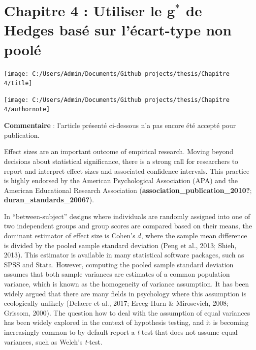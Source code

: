 \documentclass[
  english,
  man]{apa6}
\author{\phantom{0}}
\date{}
\affiliation{\phantom{0}}
\begin{document}
\hypertarget{chapitre-4-utiliser-le-bmg-de-hedges-basuxe9-sur-luxe9cart-type-non-pooluxe9}{%
\section{\texorpdfstring{Chapitre 4 : Utiliser le \(\bm{g^*}\) de Hedges basé sur l'écart-type non poolé}{Chapitre 4 : Utiliser le \textbackslash bm\{g\^{}*\} de Hedges basé sur l'écart-type non poolé}}\label{chapitre-4-utiliser-le-bmg-de-hedges-basuxe9-sur-luxe9cart-type-non-pooluxe9}}

\begin{center}\texttt{[image: C:/Users/Admin/Documents/Github projects/thesis/Chapitre 4/title]} \end{center}

\begin{center}\texttt{[image: C:/Users/Admin/Documents/Github projects/thesis/Chapitre 4/authornote]} \end{center}

\textbf{Commentaire} : l'article présenté ci-dessous n'a pas encore été accepté pour publication.

\newpage

Effect sizes are an important outcome of empirical research. Moving beyond decisions about statistical significance, there is a strong call for researchers to report and interpret effect sizes and associated confidence intervals. This practice is highly endorsed by the American Psychological Association (APA) and the American Educational Research Association (\textbf{association\_publication\_2010?}; \textbf{duran\_standards\_2006?}).

In ``between-subject'' designs where individuals are randomly assigned into one of two independent groups and group scores are compared based on their means, the dominant estimator of effect size is Cohen's \(d\), where the sample mean difference is divided by the pooled sample standard deviation (Peng et al., 2013; Shieh, 2013). This estimator is available in many statistical software packages, such as SPSS and Stata. However, computing the pooled sample standard deviation assumes that both sample variances are estimates of a common population variance, which is known as the homogeneity of variance assumption. It has been widely argued that there are many fields in psychology where this assumption is ecologically unlikely (Delacre et al., 2017; Erceg-Hurn \& Mirosevich, 2008; Grissom, 2000). The question how to deal with the assumption of equal variances has been widely explored in the context of hypothesis testing, and it is becoming increasingly common to by default report a \emph{t}-test that does not assume equal variances, such as Welch's \emph{t}-test.
\end{document}
